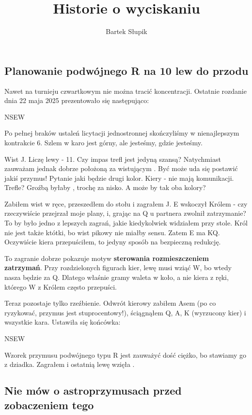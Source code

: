 \documentclass[12pt, a4paper]{article}
\title{Historie o wyciskaniu}
\author{Bartek Słupik}
\newcounter{board}
\newcommand\nextboard{\stepcounter{board}\theboard}
\begin{document}
\subsection*{Planowanie podwójnego R na 10 lew do przodu}
Nawet na turnieju czwartkowym nie można tracić koncentracji. Ostatnie rozdanie dnia 22 maja 2025 prezentowało się następująco:

\handdiagramv[\nextboard]{\vhand{K976}{J}{AJT73}{JT3}}
				{}
				{}
				{}{NSEW}
				
Po pełnej braków ustaleń licytacji jednostronnej skończyliśmy w nienajlepszym kontrakcie 6\nt. Szlem w karo jest górny, ale jesteśmy, gdzie jesteśmy.

Wist \xspades J. Liczę lewy - 11. Czy impas trefl jest jedyną szansą? Natychmiast zauważam jednak dobrze położoną za wistującym . Być może uda się postawić jakiś przymus!
Pytanie jaki będzie drugi kolor. Kiery - nie mają komunikacji. Trefle? Groźbą byłaby , trochę za nisko. A może by tak oba kolory?

Zabiłem wist w ręce, przeszedłem do stołu i zagrałem \xhearts J. E wskoczył Królem - czy rzeczywiście przejrzał moje plany, i, grając na \xhearts Q u partnera zwolnił zatrzymanie? To by było jedno z lepszych zagrań, jakie kiedykolwiek widziałem przy stole. Król nie jest także któtki, bo wist pikowy nie miałby sensu. Zatem E ma \xhearts KQ. Oczywiście kiera przepuściłem, to jedyny sposób na bezpieczną redukcję. 

To zagranie dobrze pokazuje motyw \textbf{sterowania rozmieszczeniem zatrzymań}. Przy rozdzielonych figurach kier, lewę musi wziąć W, bo wtedy nasza  będzie za \xhearts Q. Dlatego właśnie gramy waleta w koło, a nie kiera z ręki, którego W z Królem często przepuści.

Teraz pozostaje tylko rzeźbienie. Odwrót kierowy zabiłem Asem (po co ryzykować, przymus jest stuprocentowy!), ściągnąłem \xspades Q, \xclubs A, \xspades K (wyrzucony kier) i wszystkie kara. Ustawiła się końcówka:

				{}
				{}
				{}{NSEW}
				
Wzorek przymusu podwójnego typu R jest zauważyć dość ciężko, bo stawiamy go z dziadka. Zagrałem  i ostatnią lewę wzięła .



\pagebreak
\subsection*{Nie mów o astroprzymusach przed zobaczeniem tego}
\end{document}
